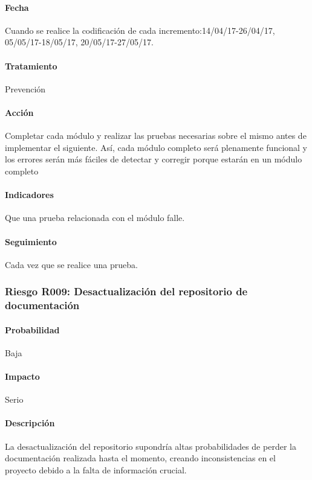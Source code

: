 \documentclass[10pt,a4paper]{article}
\begin{document}
				\paragraph{Fecha} Cuando se realice la codificación de cada incremento:14/04/17-26/04/17, 05/05/17-18/05/17, 20/05/17-27/05/17. %
				\paragraph{Tratamiento} Prevención %
				\paragraph{Acción} Completar cada módulo y realizar las pruebas necesarias sobre el mismo antes de implementar el siguiente. Así, cada módulo completo será plenamente funcional y los errores serán más fáciles de detectar y corregir porque estarán en un módulo completo%
				\paragraph{Indicadores} Que una prueba relacionada con el módulo falle.  %
				\paragraph{Seguimiento}	Cada vez que se realice una prueba. %
								
			\subsubsection{Riesgo R009: Desactualización del repositorio de documentación}
				\paragraph{Probabilidad} Baja
				\paragraph{Impacto}	Serio
				\paragraph{Descripción} La desactualización del repositorio supondría altas probabilidades de perder la documentación realizada hasta el momento, creando inconsistencias en el proyecto debido a la falta de información crucial. 
\end{document}
